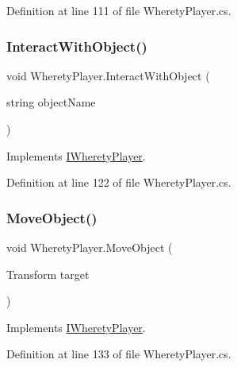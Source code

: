Definition at line 111 of file Wherety\+Player.\+cs.

\mbox{\label{class_wherety_player_a7f1fc81fea5ae4a082fc72b766171834}} 
\subsubsection{\texorpdfstring{InteractWithObject()}{InteractWithObject()}}
{\footnotesize\ttfamily void Wherety\+Player.\+Interact\+With\+Object (\begin{DoxyParamCaption}\item[{string}]{object\+Name }\end{DoxyParamCaption})}



Implements \mbox{\hyperlink{interface_i_wherety_player_af8af069999158f329d99f2709b0b4fb3}{I\+Wherety\+Player}}.



Definition at line 122 of file Wherety\+Player.\+cs.

\mbox{\label{class_wherety_player_a932686a63036f030e38a10f361d9d5d3}} 
\subsubsection{\texorpdfstring{MoveObject()}{MoveObject()}}
{\footnotesize\ttfamily void Wherety\+Player.\+Move\+Object (\begin{DoxyParamCaption}\item[{Transform}]{target }\end{DoxyParamCaption})}



Implements \mbox{\hyperlink{interface_i_wherety_player_afd5f6bbda4034e3c00502d0ac26474c1}{I\+Wherety\+Player}}.



Definition at line 133 of file Wherety\+Player.\+cs.

\mbox{\label{class_wherety_player_acf5cc5d3c1f191864bdbfa501474ec24}} 

